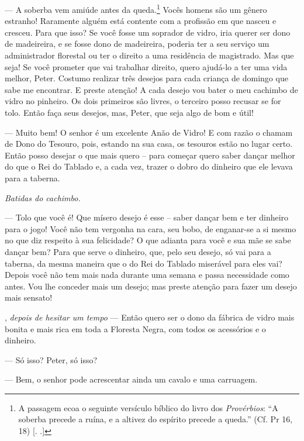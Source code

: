 \begin{myparindent}{0pt}
\begin{Parskip}
 --- A soberba vem amiúde antes da queda.\footnote{A
  passagem ecoa o seguinte versículo bíblico do livro dos
  \emph{Provérbios}: ``A soberba precede a ruína, e a altivez do
  espírito precede a queda.'' (Cf. Pr 16, 18) [. .]} Vocês
homens são um gênero estranho! Raramente alguém está contente com a
profissão em que nasceu e cresceu. Para que isso? Se você fosse um
soprador de vidro, iria querer ser dono de madeireira, e se fosse dono
de madeireira, poderia ter a seu serviço um administrador florestal ou
ter o direito a uma residência de magistrado. Mas que seja! Se você
prometer que vai trabalhar direito, quero ajudá-lo a ter uma vida
melhor, Peter. Costumo realizar três desejos para cada criança de
domingo que sabe me encontrar. E preste atenção! A cada desejo vou bater
o meu cachimbo de vidro no pinheiro. Os dois primeiros são livres, o
terceiro posso recusar se for tolo. Então faça seus desejos, mas, Peter,
que seja algo de bom e útil!

 --- Muito bem! O senhor é um excelente Anão de
Vidro! E com razão o chamam de Dono do Tesouro, pois, estando na sua
casa, os tesouros estão no lugar certo. Então posso desejar o que mais
quero -- para começar quero saber dançar melhor do que o Rei do Tablado
e, a cada vez, trazer o dobro do dinheiro que ele levava para a taberna.

\emph{Batidas do cachimbo.}

 --- Tolo que você é! Que mísero desejo é esse -- saber
dançar bem e ter dinheiro para o jogo! Você não tem vergonha na cara,
seu bobo, de enganar-se a si mesmo no que diz respeito à sua felicidade?
O que adianta para você e sua mãe se sabe dançar bem? Para que serve o
dinheiro, que, pelo seu desejo, só vai para a taberna, da mesma maneira
que o do Rei do Tablado miserável para eles vai? Depois você não tem
mais nada durante uma semana e passa necessidade como antes. Vou lhe
conceder mais um desejo; mas preste atenção para fazer um desejo mais
sensato!

, \emph{depois de hesitar um tempo} --- Então quero
ser o dono da fábrica de vidro mais bonita e mais rica em toda a
Floresta Negra, com todos os acessórios e o dinheiro.

 --- Só isso? Peter, só isso?

 --- Bem, o senhor pode acrescentar ainda um cavalo e
uma carruagem.


\end{Parskip}
\end{myparindent}
